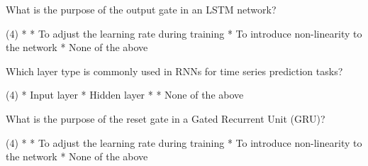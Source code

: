 \documentclass[10pt]{extarticle}
\begin{document}
\begin{exercise}
    What is the purpose of the output gate in an LSTM network?
    \begin{choice} (4)
        * 
        * To adjust the learning rate during training
        * To introduce non-linearity to the network
        * None of the above
    \end{choice}
\end{exercise}
\begin{solution}
\end{solution}

\begin{exercise}
    Which layer type is commonly used in RNNs for time series prediction tasks?
    \begin{choice} (4)
        * Input layer
        * Hidden layer
        * 
        * None of the above
    \end{choice}
\end{exercise}
\begin{solution}
\end{solution}

\begin{exercise}
    What is the purpose of the reset gate in a Gated Recurrent Unit (GRU)?
    \begin{choice} (4)
        * 
        * To adjust the learning rate during training
        * To introduce non-linearity to the network
        * None of the above
    \end{choice}
\end{exercise}
\begin{solution}
\end{solution}


\newpage
\begin{multicols*}{2}
    \printsolutions*
\end{multicols*}
\end{document}
